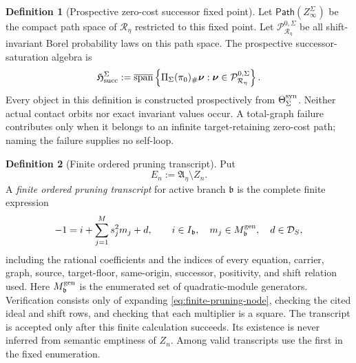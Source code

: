 \documentclass[11pt]{article}
\numberwithin{section}{part}
\theoremstyle{plain}
\theoremstyle{definition}
\newtheorem{definition}[definition]{Definition}
\theoremstyle{remark}
\begin{document}
\begin{definition}[Prospective zero-cost successor fixed point]
Let \(\mathsf{Path}(Z_\infty^\Sigma)\) be the compact path space of
\(\mathcal R_\eta\) restricted to this fixed point.  Let
\(\mathcal P_{\mathcal R_\eta}^{0,\Sigma}\) be all shift-invariant Borel
probability laws on this path space.  The prospective successor-saturation
algebra is
\begin{equation}
 \label{eq:total-successor-saturation-algebra}
 \mathfrak H_{\rm succ}^{\Sigma}
 :=
 \overline{\operatorname{span}}
 \left\{
  \Pi_\Sigma(\pi_0)_\#\boldsymbol\nu:
  \boldsymbol\nu\in\mathcal P_{\mathcal R_\eta}^{0,\Sigma}
 \right\}.
\end{equation}
Every object in this definition is constructed prospectively from
\(\Theta_\Sigma^{\rm syn}\).  Neither actual contact orbits nor exact invariant
values occur.  A total-graph failure contributes only when it belongs to an
infinite target-retaining zero-cost path; naming the failure supplies no
self-loop.
\end{definition}

\begin{definition}[Finite ordered pruning transcript]
\label{def:finite-pruning-transcript}
Put
\begin{equation}
 \label{eq:elimination-rank-sets}
 E_n:=\mathfrak A_\eta\setminus Z_n.
\end{equation}
A \emph{finite ordered pruning transcript} for active branch \(\mathfrak b\) is
the complete finite expression
\begin{equation}
 \label{eq:finite-pruning-node}
 -1=i+\sum_{j=1}^{M}s_j^2m_j+d,
 \qquad
 i\in I_{\mathfrak b},\quad m_j\in M_{\mathfrak b}^{\rm gen},
 \quad d\in\mathcal D_S,
\end{equation}
including the rational coefficients and the indices of every equation,
carrier, graph, source, target-floor, same-origin, successor, positivity, and
shift relation used.  Here \(M_{\mathfrak b}^{\rm gen}\) is the enumerated set of
quadratic-module generators.  Verification consists only of expanding
\eqref{eq:finite-pruning-node}, checking the cited ideal and shift rows, and
checking that each multiplier is a square.  The transcript is accepted only
after this finite calculation succeeds.  Its existence is never inferred
from semantic emptiness of \(Z_n\).  Among valid transcripts use the first in
the fixed enumeration.
\end{definition}
\end{document}
